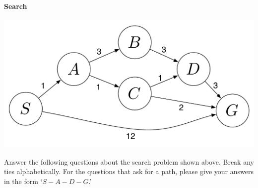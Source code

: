 \paragraph{Search}
\begin{center}
  \includegraphics[width=0.6\linewidth]{figures/search_problem.pdf}
\end{center}
Answer the following questions about the search problem shown above. Break any ties alphabetically. For the questions that ask for a path, please give your answers in the form `$S-A-D-G$.'

